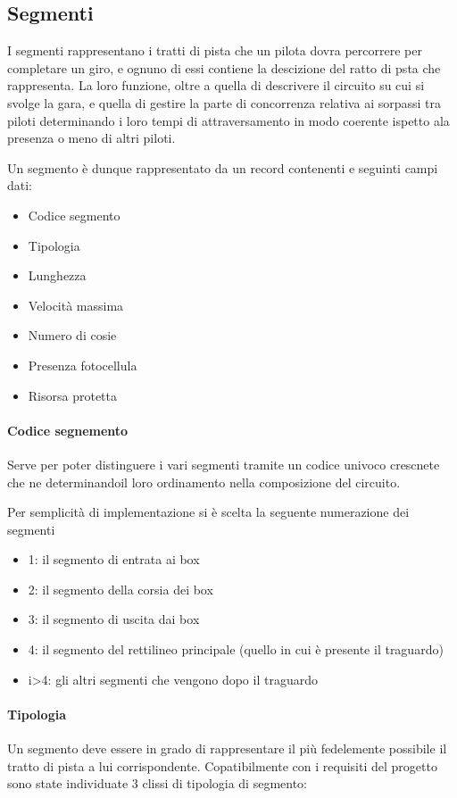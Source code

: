 \documentclass[a4paper,11pt, twoside]{book}
\begin{document}
      \subsection{Segmenti}
	I segmenti rappresentano i tratti di pista che un pilota dovra percorrere per completare un giro,
	e ognuno di essi contiene la descizione del ratto di psta che rappresenta.
	La loro funzione, oltre a quella di descrivere il circuito su cui si svolge la gara, e quella
	di gestire la parte di concorrenza relativa ai sorpassi tra piloti determinando i loro tempi di attraversamento
	in modo coerente ispetto ala presenza o meno di altri piloti.
	
	Un segmento è dunque rappresentato da un record contenenti e seguinti campi dati:
	
	\begin{itemize}
	  \item Codice segmento
	  \item Tipologia
	  \item Lunghezza
	  \item Velocità massima
	  \item Numero di cosie
	  \item Presenza fotocellula
	  \item Risorsa protetta
	\end{itemize}
	
	\paragraph{Codice segnemento}
	  Serve per poter distinguere i vari segmenti tramite un codice univoco crescnete che ne determinandoil loro ordinamento
	  nella composizione del circuito. 

	  Per semplicità di implementazione si è scelta la seguente numerazione dei segmenti
	  \begin{itemize}
	    \item 1: il segmento di entrata ai box
	    \item 2: il segmento della corsia dei box
	    \item 3: il segmento di uscita dai box
	    \item 4: il segmento del rettilineo principale (quello in cui è presente il traguardo)
	    \item i>4: gli altri segmenti che vengono dopo il traguardo
	  \end{itemize}
	
	\paragraph{Tipologia}
	  Un segmento deve essere in grado di rappresentare il più fedelemente possibile il tratto di pista
	  a lui corrispondente. Copatibilmente con i requisiti del progetto sono state individuate 3 clissi
	  di tipologia di segmento:
	  
\end{document}
